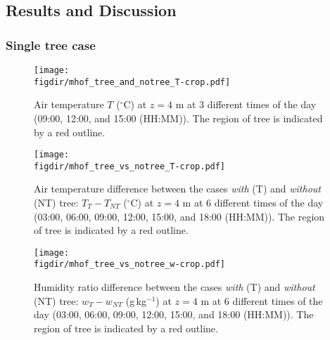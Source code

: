 \subsection{Results and Discussion}

\subsubsection{Single tree case}

\begin{figure}[p]
	\centering
	\texttt{[image: \\figdir/mhof\_tree\_and\_notree\_T-crop.pdf]}
	\caption{Air temperature $T$ ($^{\circ}$C) at $z=4$ m at 3 different times of the day (09:00, 12:00, and 15:00 (HH:MM)). The region of tree is indicated by a red outline.}
	\label{fig:T_muensterhof}
\end{figure}

\begin{figure}[p]
	\centering
	\texttt{[image: \\figdir/mhof\_tree\_vs\_notree\_T-crop.pdf]}
	\caption{Air temperature difference between the cases \textit{with} (T) and \textit{without} (NT) tree: $T_{T}-T_{\textit{NT}}$ ($^{\circ}$C) at $z=4$ m at 6 different times of the day (03:00, 06:00, 09:00, 12:00, 15:00, and 18:00 (HH:MM)). The region of tree is indicated by a red outline.}
	\label{fig:Tdiff_muensterhof}
\end{figure}

\begin{figure}[p]
	\centering
	\texttt{[image: \\figdir/mhof\_tree\_vs\_notree\_w-crop.pdf]}
	\caption{Humidity ratio difference between the cases \textit{with} (T) and \textit{without} (NT) tree: $w_{T}-w_{\textit{NT}}$ (g\,kg$^{-1}$) at $z=4$ m at 6 different times of the day (03:00, 06:00, 09:00, 12:00, 15:00, and 18:00 (HH:MM)). The region of tree is indicated by a red outline.}
	\label{fig:wdiff_muensterhof}
\end{figure}

